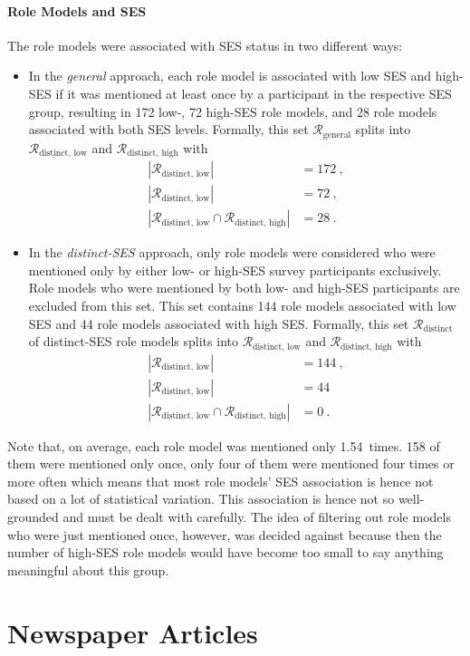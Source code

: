 \paragraph{Role Models and SES}
The role models were associated with SES status in two different ways:
\begin{itemize}
    \item In the \textit{general} approach, each role model is associated with low SES and high-SES if it was mentioned at least once by a participant in the respective SES group, resulting in \SI{172}{} low-, \SI{72}{} high-SES role models, and \SI{28}{} role models associated with both SES levels. Formally, this set $\mathcal{R}_\text{general}$ splits into $\mathcal{R}_\text{distinct, low}$ and $\mathcal{R}_\text{distinct, high}$ with
    \begin{align*}
        \left|\mathcal{R}_\text{distinct, low}\right| &= \SI{172}{},\\
        \left|\mathcal{R}_\text{distinct, low}\right| &= \SI{72}{},\\
        \left|\mathcal{R}_\text{distinct, low} \cap \mathcal{R}_\text{distinct, high}\right| &= \SI{28}{}.
    \end{align*}

    \item In the \textit{distinct-SES} approach, only role models were considered who were mentioned only by either low- or high-SES survey participants exclusively. Role models who were mentioned by both low- and high-SES participants are excluded from this set. This set contains \SI{144}{} role models associated with low SES and \SI{44}{} role models associated with high SES. Formally, this set $\mathcal{R}_\text{distinct}$ of distinct-SES role models splits into $\mathcal{R}_\text{distinct, low}$ and $\mathcal{R}_\text{distinct, high}$ with 
    \begin{align*}
        \left|\mathcal{R}_\text{distinct, low}\right| &= \SI{144}{},\\
        \left|\mathcal{R}_\text{distinct, low}\right| &= \SI{44}{}\\
        \left|\mathcal{R}_\text{distinct, low} \cap \mathcal{R}_\text{distinct, high}\right| &= \SI{0}{}.
    \end{align*}    
\end{itemize}

Note that, on average, each role model was mentioned only \SI{1.54}{times}. \SI{158}{} of them were mentioned only once, only four of them were mentioned four times or more often which means that most role models' SES association is hence not based on a lot of statistical variation. This association is hence not so well-grounded and must be dealt with carefully. The idea of filtering out role models who were just mentioned once, however, was decided against because then the number of high-SES role models would have become too small to say anything meaningful about this group.


\section{Newspaper Articles}